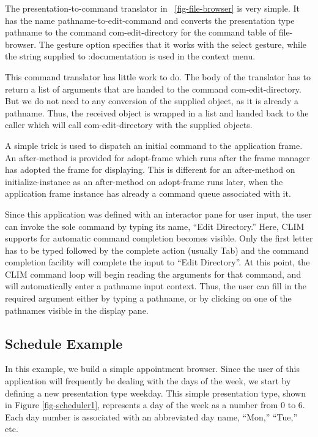 \documentclass[twocolumn,a4paper]{article}
\newcommand {\code}[1]{{\sffamily #1}}
\newcommand {\CLIM}{{\small CLIM}}
\let\class\code
\let\method\code
\let\keyword\code
\begin{document}
The presentation-to-command translator in
\figurename~\ref{fig-file-browser} is very simple. It has the name
\class{pathname-to-edit-command} and converts the presentation type
\code{pathname} to the command \code{com-edit-directory} for the
command table of \class{file-browser}. The gesture option specifies
that it works with the select gesture, while the string supplied to
\keyword{:documentation} is used in the context menu.

This command translator has little work to do. The body of the
translator has to return a list of arguments that are handed to the
command \code{com-edit-directory}. But we do not need to any
conversion of the supplied object, as it is already a pathname. Thus,
the received object is wrapped in a list and handed back to the caller
which will call \code{com-edit-directory} with the supplied objects.

A simple trick is used to dispatch an initial command to the
application frame. An after-method is provided for
\method{adopt-frame} which runs after the frame manager has adopted
the frame for displaying. This is different for an after-method on
\method{initialize-instance} as an after-method on
\method{adopt-frame} runs later, when the application frame instance
has already a command queue associated with it.

Since this application was defined with an interactor pane for user
input, the user can invoke the sole command by typing its name, ``Edit
Directory.'' Here, \CLIM{} supports for automatic command completion
becomes visible. Only the first letter has to be typed followed by the
complete action (usually Tab) and the command completion facility will
complete the input to ``Edit Directory''. At this point, the \CLIM{}
command loop will begin reading the arguments for that command, and
will automatically enter a pathname input context. Thus, the user can
fill in the required argument either by typing a pathname, or by
clicking on one of the pathnames visible in the display pane.

\subsection{Schedule Example}

In this example, we build a simple appointment browser. Since the user
of this application will frequently be dealing with the days of the
week, we start by defining a new presentation type weekday. This
simple presentation type, shown in Figure \ref{fig-scheduler1},
represents a day of the week as a number from 0 to 6. Each day number
is associated with an abbreviated day name, ``Mon,'' ``Tue,'' etc.
\end{document}
